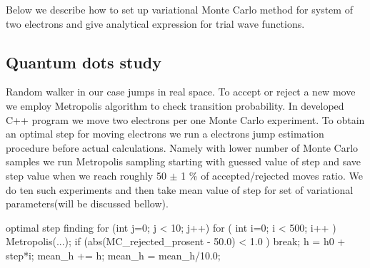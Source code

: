 \documentclass[10pt]{article}
\begin{document}
Below we describe how to set up variational Monte Carlo method for system of two electrons and give analytical expression for trial wave functions.

\subsection{Quantum dots study}
Random walker in our case jumps in real space. To accept or reject a new move we employ Metropolis algorithm to check transition probability.
In developed C++ program we move two electrons per one Monte Carlo experiment. To obtain an optimal step for moving electrons we run a electrons jump estimation procedure before actual calculations. Namely with lower number of Monte Carlo samples we run Metropolis sampling starting with guessed value of step and save step value when we reach roughly 50 $\pm $ 1 \% of accepted/rejected moves ratio. We do ten such experiments and then take mean value of step for set of variational parameters(will be discussed bellow).
\begin{pseudolisting}{optimal step finding}
for (int j=0; j < 10; j++) {
 for ( int i=0; i < 500; i++ ){
  Metropolis(...);
   if (abs(MC_rejected_prosent - 50.0) < 1.0 ){
    break;
   }
   h = h0 + step*i;
 }
 mean_h += h;
}
mean_h = mean_h/10.0;
\end{pseudolisting}
\end{document}
